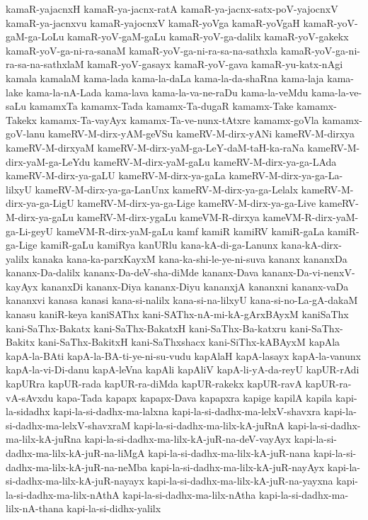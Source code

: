 {kamaR-yajacnxH
kamaR-ya-jacnx-ratA
kamaR-ya-jacnx-satx-poV-yajocnxV
kamaR-ya-jacnxvu
kamaR-yajocnxV
kamaR-yoVga
kamaR-yoVgaH
kamaR-yoV-gaM-ga-LoLu
kamaR-yoV-gaM-gaLu
kamaR-yoV-ga-dalilx
kamaR-yoV-gakekx
kamaR-yoV-ga-ni-ra-sanaM
kamaR-yoV-ga-ni-ra-sa-na-sathxla
kamaR-yoV-ga-ni-ra-sa-na-sathxlaM
kamaR-yoV-gasayx
kamaR-yoV-gava
kamaR-yu-katx-nAgi
kamala
kamalaM
kama-lada
kama-la-daLa
kama-la-da-shaRna
kama-laja
kama-lake
kama-la-nA-Lada
kama-lava
kama-la-va-ne-raDu
kama-la-veMdu
kama-la-ve-saLu
kamamxTa
kamamx-Tada
kamamx-Ta-dugaR
kamamx-Take
kamamx-Takekx
kamamx-Ta-vayAyx
kamamx-Ta-ve-nunx-tAtxre
kamamx-goVla
kamamx-goV-lanu
kameRV-M-dirx-yAM-geVSu
kameRV-M-dirx-yANi
kameRV-M-dirxya
kameRV-M-dirxyaM
kameRV-M-dirx-yaM-ga-LeY-daM-taH-ka-raNa
kameRV-M-dirx-yaM-ga-LeYdu
kameRV-M-dirx-yaM-gaLu
kameRV-M-dirx-ya-ga-LAda
kameRV-M-dirx-ya-gaLU
kameRV-M-dirx-ya-gaLa
kameRV-M-dirx-ya-ga-La-lilxyU
kameRV-M-dirx-ya-ga-LanUnx
kameRV-M-dirx-ya-ga-Lelalx
kameRV-M-dirx-ya-ga-LigU
kameRV-M-dirx-ya-ga-Lige
kameRV-M-dirx-ya-ga-Live
kameRV-M-dirx-ya-gaLu
kameRV-M-dirx-ygaLu
kameVM-R-dirxya
kameVM-R-dirx-yaM-ga-Li-geyU
kameVM-R-dirx-yaM-gaLu
kamf
kamiR
kamiRV
kamiR-gaLa
kamiR-ga-Lige
kamiR-gaLu
kamiRya
kanURlu
kana-kA-di-ga-Lanunx
kana-kA-dirx-yalilx
kanaka
kana-ka-parxKayxM
kana-ka-shi-le-ye-ni-suva
kananx
kananxDa
kananx-Da-dalilx
kananx-Da-deV-sha-diMde
kananx-Dava
kananx-Da-vi-nenxV-kayAyx
kananxDi
kananx-Diya
kananx-Diyu
kananxjA
kananxni
kananx-vaDa
kananxvi
kanasa
kanasi
kana-si-nalilx
kana-si-na-lilxyU
kana-si-no-La-gA-dakaM
kanasu
kaniR-keya
kaniSAThx
kani-SAThx-nA-mi-kA-gArxBAyxM
kaniSaThx
kani-SaThx-Bakatx
kani-SaThx-BakatxH
kani-SaThx-Ba-katxru
kani-SaThx-Bakitx
kani-SaThx-BakitxH
kani-SaThxshacx
kani-SiThx-kABAyxM
kapAla
kapA-la-BAti
kapA-la-BA-ti-ye-ni-su-vudu
kapAlaH
kapA-lasayx
kapA-la-vanunx
kapA-la-vi-Di-danu
kapA-leVna
kapAli
kapAliV
kapA-li-yA-da-reyU
kapUR-rAdi
kapURra
kapUR-rada
kapUR-ra-diMda
kapUR-rakekx
kapUR-ravA
kapUR-ra-vA-sAvxdu
kapa-Tada
kapapx
kapapx-Dava
kapapxra
kapige
kapilA
kapila
kapi-la-sidadhx
kapi-la-si-dadhx-ma-lalxna
kapi-la-si-dadhx-ma-lelxV-shavxra
kapi-la-si-dadhx-ma-lelxV-shavxraM
kapi-la-si-dadhx-ma-lilx-kA-juRnA
kapi-la-si-dadhx-ma-lilx-kA-juRna
kapi-la-si-dadhx-ma-lilx-kA-juR-na-deV-vayAyx
kapi-la-si-dadhx-ma-lilx-kA-juR-na-liMgA
kapi-la-si-dadhx-ma-lilx-kA-juR-nana
kapi-la-si-dadhx-ma-lilx-kA-juR-na-neMba
kapi-la-si-dadhx-ma-lilx-kA-juR-nayAyx
kapi-la-si-dadhx-ma-lilx-kA-juR-nayayx
kapi-la-si-dadhx-ma-lilx-kA-juR-na-yayxna
kapi-la-si-dadhx-ma-lilx-nAthA
kapi-la-si-dadhx-ma-lilx-nAtha
kapi-la-si-dadhx-ma-lilx-nA-thana
kapi-la-si-didhx-yalilx
}
